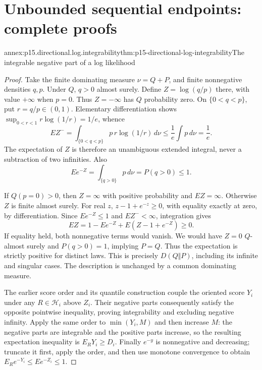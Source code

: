 \section{Unbounded sequential endpoints: complete proofs}
\label{sec:annex-p15-robust-sequential-endpoints}

\begin{annexitem}{annex:p15.directional.log.integrability}{thm:p15-directional-log-integrability}{The integrable negative part of a log likelihood}
\begin{proof}
Take the finite dominating measure \(\nu=Q+P\), and finite
nonnegative densities \(q,p\). Under \(Q\), \(q>0\) almost surely.
Define \(Z=\log(q/p)\) there, with value \(+\infty\) when \(p=0\).
Thus \(Z=-\infty\) has \(Q\) probability zero. On \(\{0<q<p\}\),
put \(r=q/p\in(0,1)\). Elementary differentiation shows
\(\sup_{0<r<1}r\log(1/r)=1/e\), whence
\[
 EZ^-=\int_{\{0<q<p\}}p\,r\log(1/r)\,d\nu
                         \leq\frac1e\int p\,d\nu=\frac1e.
\]
The expectation of \(Z\) is therefore an unambiguous extended
integral, never a subtraction of two infinities.
Also
\[
 Ee^{-Z}=\int_{\{q>0\}}p\,d\nu=P(q>0)\leq1.
\]

If \(Q(p=0)>0\), then \(Z=\infty\) with positive probability and
\(EZ=\infty\). Otherwise \(Z\) is finite almost surely.
For real \(z\), \(z-1+e^{-z}\geq0\), with equality exactly at zero,
by differentiation. Since \(Ee^{-Z}\leq1\) and \(EZ^-<\infty\),
integration gives
\[
 EZ=1-Ee^{-Z}+E(Z-1+e^{-Z})\geq0.
\]
If equality held, both nonnegative terms would vanish. We would have
\(Z=0\) \(Q\)-almost surely and \(P(q>0)=1\), implying \(P=Q\).
Thus the expectation is strictly positive for distinct laws.
This is precisely \(D(Q\Vert P)\), including its infinite and singular
cases. The description is unchanged by a common dominating measure.

The earlier score order and its quantile construction couple the
oriented score \(Y_i\) under any \(R\in\mathcal H_i\) above \(Z_i\).
Their negative parts consequently satisfy the opposite pointwise
inequality, proving integrability and excluding negative infinity.
Apply the same order to \(\min(Y_i,M)\) and then increase \(M\):
the negative parts are integrable and the positive parts increase,
so the resulting expectation inequality is \(E_RY_i\geq D_i\).
Finally \(e^{-y}\) is nonnegative and decreasing; truncate it first,
apply the order, and then use monotone convergence to obtain
\(E_Re^{-Y_i}\leq E e^{-Z_i}\leq1\).
\end{proof}
\end{annexitem}

